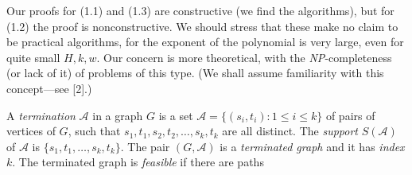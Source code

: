 Our proofs for (1.1) and (1.3) are constructive (we find the algorithms), but for (1.2) the proof is nonconstructive. We should stress that these make no claim to be practical algorithms, for the exponent of the polynomial is very large, even for quite small $H, k, w$. Our concern is more theoretical, with the \textit{NP}-completeness (or lack of it) of problems of this type. (We shall assume familiarity with this concept---see [2].)

A \textit{termination} $\mathscr{A}$ in a graph $G$ is a set $\mathscr{A} = \{(s_i, t_i) : 1 \le i \le k\}$ of pairs of vertices of $G$, such that $s_1, t_1, s_2, t_2, \dots, s_k, t_k$ are all distinct. The \textit{support} $S(\mathscr{A})$ of $\mathscr{A}$ is $\{s_1, t_1, \dots, s_k, t_k\}$. The pair $(G, \mathscr{A})$ is a \textit{terminated graph} and it has \textit{index} $k$. The terminated graph is \textit{feasible} if there are paths
